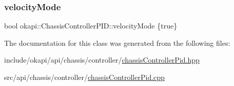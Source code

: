 \subsubsection{\texorpdfstring{velocityMode}{velocityMode}}
{\footnotesize\ttfamily bool okapi\+::\+Chassis\+Controller\+P\+I\+D\+::velocity\+Mode \{true\}\hspace{0.3cm}{\ttfamily [protected]}}



The documentation for this class was generated from the following files\+:\begin{DoxyCompactItemize}
\item 
include/okapi/api/chassis/controller/\mbox{\hyperlink{chassisControllerPid_8hpp}{chassis\+Controller\+Pid.\+hpp}}\item 
src/api/chassis/controller/\mbox{\hyperlink{chassisControllerPid_8cpp}{chassis\+Controller\+Pid.\+cpp}}\end{DoxyCompactItemize}
